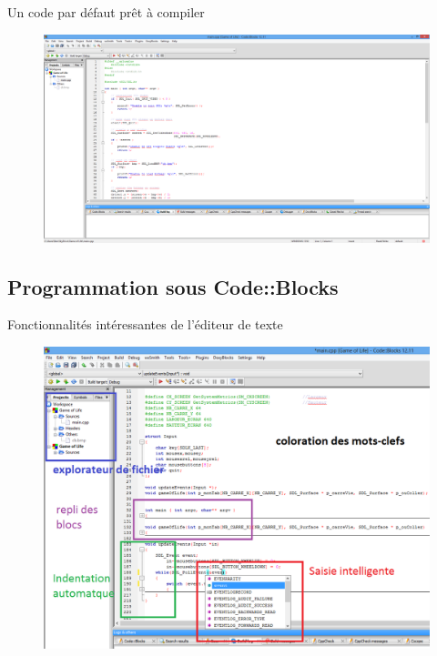\documentclass{beamer}
\begin{document}
\begin{frame}{Un code par défaut prêt à compiler}
\begin{figure}
\includegraphics[scale=0.22]{../images/cb03.png}
\label{cb03}				
\end{figure}
\end{frame}


\subsection{Programmation sous Code::Blocks}

\begin{frame}{Fonctionnalités intéressantes de l'éditeur de texte}
\begin{figure}
\includegraphics[scale=0.28]{../images/cb04.png}
\label{cb04}				
\end{figure}
\end{frame}
\end{document}
